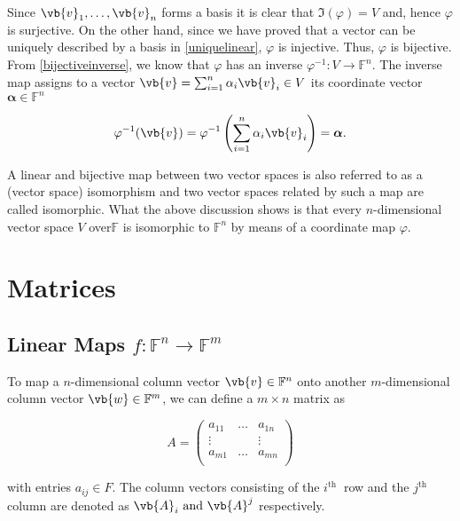 \documentclass[a4paper,12pt]{report}
\begin{document}
Since \(\vb{v}_{1}, \ldots, \vb{v}_n \) forms a basis it is clear that \(\Im (\varphi ) = V\) and, hence \(\varphi \) is surjective. On the other hand, since we have proved that a vector can be uniquely described by a basis in \cref{uniquelinear}, \(\varphi \) is injective. Thus, \(\varphi \) is bijective. From \cref{bijectiveinverse}, we know that \(\varphi \) has an inverse \(\varphi ^{-1} : V \rightarrow \mathbb{F}^{n} \). The inverse map assigns to a vector \(\vb{v} = \sum_{i=1}^{n} \alpha _{i} \vb{v} _{i} \in V\) its coordinate vector \(\boldsymbol{\alpha } \in \mathbb{F}^{n}  \)

\begin{equation}
    \varphi ^{-1} (\vb{v} ) = \varphi ^{-1} \left( \sum_{i=1}^{n} \alpha _{i} \vb{v} _{i}  \right) = \boldsymbol{\alpha }. 
\end{equation}

A linear and bijective map between two vector spaces is also referred to as a (vector space) isomorphism and two vector spaces related by such a map are called isomorphic. What the above discussion shows is that every \(n\)-dimensional vector space \(V\) over\(\mathbb{F}\) is isomorphic to \(\mathbb{F}^{n} \) by means of a coordinate map \(\varphi \). 

\section{Matrices}

\subsection{Linear Maps \(f: \mathbb{F}^{n} \rightarrow \mathbb{F}^{m}  \)}
To map a \(n\)-dimensional column vector \(\vb{v} \in \mathbb{F}^{n} \) onto another \(m\)-dimensional column vector \(\vb{w} \in \mathbb{F}^{m} \), we can define a \(m \times  n\) matrix as 

\begin{equation}
    A = \begin{pmatrix}
        a_{11} & \ldots  & a_{1n}   \\
        \vdots  &  & \vdots  \\
        a_{m1}  & \ldots  & a_{mn}  \\
    \end{pmatrix}
\end{equation}

with entries \(a_{ij} \in F \). The column vectors consisting of the \(i^{\text{th }} \) row and the \(j^{\text{th }} \) column are denoted as \(\vb{A} _{i} \text { and } \vb{A} ^{j} \) respectively. 
\end{document}
